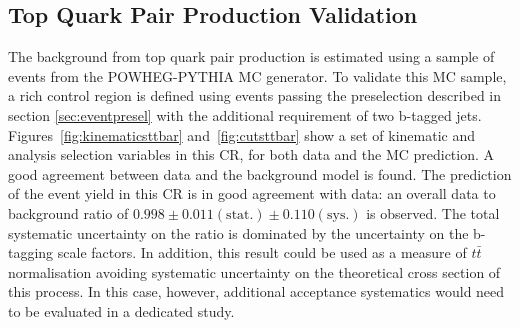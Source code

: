 \subsection{Top Quark Pair Production Validation}
\label{sec:top_est}

The background from top quark pair production is estimated using a sample of events from the POWHEG-PYTHIA MC
generator. To validate this MC sample,  a \ttbar rich control region is defined using events passing the preselection described in section \ref{sec:eventpresel} with the additional requirement of two b-tagged jets.
Figures~\ref{fig:kinematicsttbar} and~\ref{fig:cutsttbar} show a set of kinematic and analysis selection
variables in this CR, for both data and the MC prediction. A good agreement between data and the background model is found.
The prediction of the event yield in this CR is in good agreement with data: an overall
data to background ratio of $0.998 \pm 0.011\mathrm{(stat.)} \pm 0.110 \mathrm{(sys.)}$ is observed. The total systematic uncertainty on the ratio is dominated by the uncertainty on the b-tagging scale factors. In addition, this result could be used
as a measure of $t\bar{t}$ normalisation avoiding systematic uncertainty on the theoretical cross section of
this process. In this case, however, additional acceptance systematics would need to be evaluated in a dedicated study.
%

